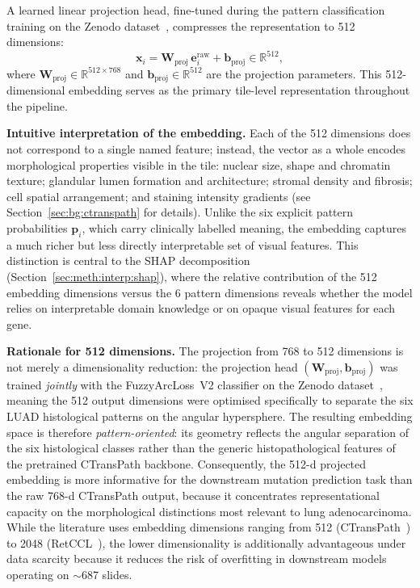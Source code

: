 A learned linear projection head, fine-tuned during the pattern classification training on the Zenodo dataset~\cite{anorak2024}, compresses the representation to 512 dimensions:
\begin{equation}
\label{eq:projection}
\mathbf{x}_i = \mathbf{W}_{\text{proj}} \, \mathbf{e}_i^{\text{raw}} + \mathbf{b}_{\text{proj}} \in \mathbb{R}^{512},
\end{equation}
where $\mathbf{W}_{\text{proj}} \in \mathbb{R}^{512 \times 768}$ and $\mathbf{b}_{\text{proj}} \in \mathbb{R}^{512}$ are the projection parameters.
This 512-dimensional embedding serves as the primary tile-level representation throughout the pipeline.

\textbf{Intuitive interpretation of the embedding.}
Each of the 512 dimensions does not correspond to a single named
feature; instead, the vector as a whole encodes morphological
properties visible in the tile: nuclear size, shape and chromatin
texture; glandular lumen formation and architecture; stromal density
and fibrosis; cell spatial arrangement; and staining intensity
gradients (see Section~\ref{sec:bg:ctranspath} for details).
Unlike the six explicit pattern probabilities $\mathbf{p}_i$, which
carry clinically labelled meaning, the embedding captures a much
richer but less directly interpretable set of visual features.
This distinction is central to the SHAP
decomposition~\cite{lundberg2017shap}
(Section~\ref{sec:meth:interp:shap}), where the relative contribution
of the
512 embedding dimensions versus the 6 pattern dimensions reveals
whether the model relies on interpretable domain knowledge or on
opaque visual features for each gene.

\textbf{Rationale for 512 dimensions.}
The projection from 768 to 512 dimensions is not merely a
dimensionality reduction: the projection head
$(\mathbf{W}_{\text{proj}}, \mathbf{b}_{\text{proj}})$ was trained
\emph{jointly} with the FuzzyArcLoss~V2 classifier on the Zenodo
dataset~\cite{anorak2024}, meaning the 512 output dimensions were optimised specifically
to separate the six LUAD histological patterns on the angular
hypersphere.
The resulting embedding space is therefore \emph{pattern-oriented}:
its geometry reflects the angular separation of the six histological
classes rather than the generic histopathological features of the
pretrained CTransPath backbone.
Consequently, the 512-d projected embedding is more informative
for the downstream mutation prediction task than the raw 768-d
CTransPath output, because it concentrates representational capacity
on the morphological distinctions most relevant to lung adenocarcinoma.
While the literature uses embedding dimensions ranging from 512
(CTransPath~\cite{wang2022ctranspath}) to 2048 (RetCCL~\cite{wang2023retccl}), the lower
dimensionality is additionally advantageous under data scarcity
because it reduces the risk of overfitting in downstream models
operating on $\sim$687 slides.


